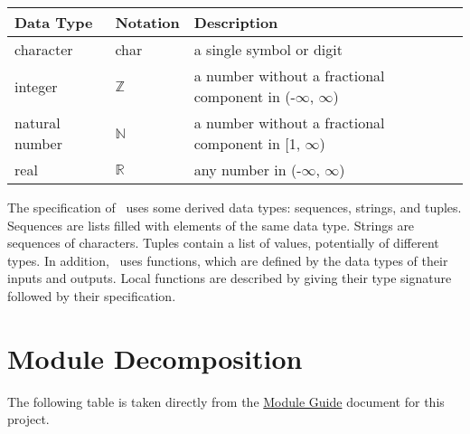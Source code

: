 \documentclass[12pt, titlepage]{article}
\begin{document}
\begin{center}
\renewcommand{\arraystretch}{1.2}
\noindent 
\begin{tabular}{l l p{7.5cm}} 
\toprule 
\textbf{Data Type} & \textbf{Notation} & \textbf{Description}\\ 
\midrule
character & char & a single symbol or digit\\
integer & $\mathbb{Z}$ & a number without a fractional component in (-$\infty$, $\infty$) \\
natural number & $\mathbb{N}$ & a number without a fractional component in [1, $\infty$) \\
real & $\mathbb{R}$ & any number in (-$\infty$, $\infty$)\\
\bottomrule
\end{tabular} 
\end{center}

\noindent
The specification of \progname \ uses some derived data types: sequences, strings, and
tuples. Sequences are lists filled with elements of the same data type. Strings
are sequences of characters. Tuples contain a list of values, potentially of
different types. In addition, \progname \ uses functions, which
are defined by the data types of their inputs and outputs. Local functions are
described by giving their type signature followed by their specification.

\section{Module Decomposition}

The following table is taken directly from the \href{https://github.com/stanreee/sign-language-learning/blob/DesignDocRev0/docs/Design/SoftArchitecture/MG.pdf}{Module Guide} document for this project.
\end{document}
